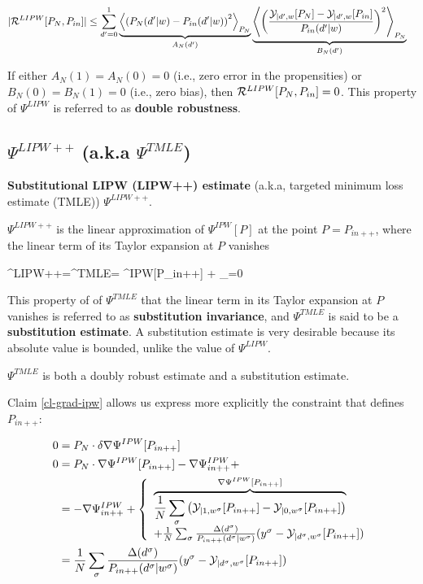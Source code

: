 \begin{align}
|{\cal R}^{LIPW}[P_N,P_{in}]|&\leq
\sum_{d'=0}^1
\underbrace{
\left\langle
\left(
P_N(d'|w)-P_{in}(d'|w)
\right)^2
\right\rangle_{P_N}
}_{A_N(d')}
\underbrace{
\left\langle
\left(
\frac{
{\cal Y}_{|d',w}[P_N]-{\cal Y}_{|d',w}[P_{in}]}
{P_{in}(d'|w)}
\right)^2
\right\rangle_{P_N}
}_{B_N(d')}
\end{align}

If either $A_N(1)=A_N(0)=0$ (i.e.,
zero error in the propensities) or $B_N(0)=B_N(1)=0$ (i.e.,
zero bias),
then ${\cal R}^{LIPW}[P_N,P_{in}]=0$.
This property
of $\Psi^{LIPW}$ is referred to as {\bf double robustness}.


\subsection{$\Psi^{LIPW++}$ (a.k.a $\Psi^{TMLE}$)}

{\bf Substitutional LIPW (LIPW++) estimate}
(a.k.a, targeted minimum loss estimate (TMLE)) $\Psi^{LIPW++}$.

$\Psi^{LIPW++}$ is the
linear approximation
 of $\Psi^{IPW}[P]$ at the point $P=P_{in++}$,
where the linear term
of its Taylor expansion at $P$ vanishes

\beq
\Psi^{LIPW++}=\Psi^{TMLE}=
\Psi^{IPW}[P_{in++}] +
_{=0}
\eeq

This property of
of $\Psi^{TMLE}$
that the linear term
in its Taylor expansion at $P$ vanishes
is referred to as {\bf substitution
invariance}, and $\Psi^{TMLE}$
is said to be a {\bf substitution estimate}.
A substitution estimate is
very desirable because
its
absolute value is bounded, unlike
the value of $\Psi^{LIPW}$.

$\Psi^{TMLE}$ is both
a doubly robust estimate and a substitution estimate.

Claim \ref{cl-grad-ipw} allows us
express
more explicitly the constraint that defines $P_{in++}$:

\begin{align}
0 &=
P_N\cdot\delta\nabla\Psi^{IPW}[P_{in++}]
\\
0 &=
P_N\cdot\nabla\Psi^{IPW}[P_{in++}]-\nabla\Psi^{IPW}_{in++}+
\\
&= -\nabla\Psi^{IPW}_{in++}+
\left\{
\begin{array}{l}
\overbrace{
\frac{1}{N}
\sum_\sigma
\left(
{\cal Y}_{|1,w^\sigma}[P_{in++}]
-
{\cal Y}_{|0,w^\sigma}[P_{in++}]
\right)
}^{ \nabla\Psi^{IPW}[P_{in++}]}
\\
+
\frac{1}{N}
\sum_\sigma
\frac{\Delta(d^\sigma)}{P_{in++}(d^\sigma|w^\sigma)}
(y^\sigma-{\cal Y}_{|d^\sigma,w^\sigma}[P_{in++}])
\end{array}
\right.
\\
&=
\frac{1}{N}
\sum_\sigma
\frac{\Delta(d^\sigma)}{P_{in++}(d^\sigma|w^\sigma)}
(y^\sigma-{\cal Y}_{|d^\sigma,w^\sigma}[P_{in++}])
\end{align}


